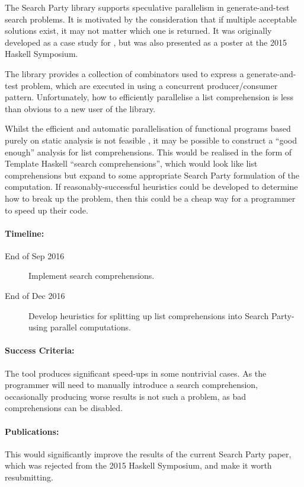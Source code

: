The Search Party library supports speculative parallelism in
generate-and-test search problems. It is motivated by the
consideration that if multiple acceptable solutions exist, it may not
matter which one is returned. It was originally developed as a case
study for \dejafu{}, but was also presented as a poster at the 2015
Haskell Symposium.

The library provides a collection of combinators used to express a
generate-and-test problem, which are executed in using a concurrent
producer/consumer pattern. Unfortunately, how to efficiently
parallelise a list comprehension is less than obvious to a new user of
the library.

Whilst the efficient and automatic parallelisation of functional
programs based purely on static analysis is not feasible
\citep{autopar}, it may be possible to construct a ``good enough''
analysis for list comprehensions. This would be realised in the form
of Template Haskell ``search comprehensions'', which would look like
list comprehensions but expand to some appropriate Search Party
formulation of the computation. If reasonably-successful heuristics
could be developed to determine how to break up the problem, then this
could be a cheap way for a programmer to speed up their code.

\paragraph{Timeline:}

\begin{description}
\item[End of Sep 2016] Implement search comprehensions.

\item[End of Dec 2016] Develop heuristics for splitting up list
  comprehensions into Search Party-using parallel computations.
\end{description}

\paragraph{Success Criteria:}

The tool produces significant speed-ups in some nontrivial cases. As
the programmer will need to manually introduce a search comprehension,
occasionally producing worse results is not such a problem, as bad
comprehensions can be disabled.

\paragraph{Publications:}

This would significantly improve the results of the current Search
Party paper, which was rejected from the 2015 Haskell Symposium, and
make it worth resubmitting.
